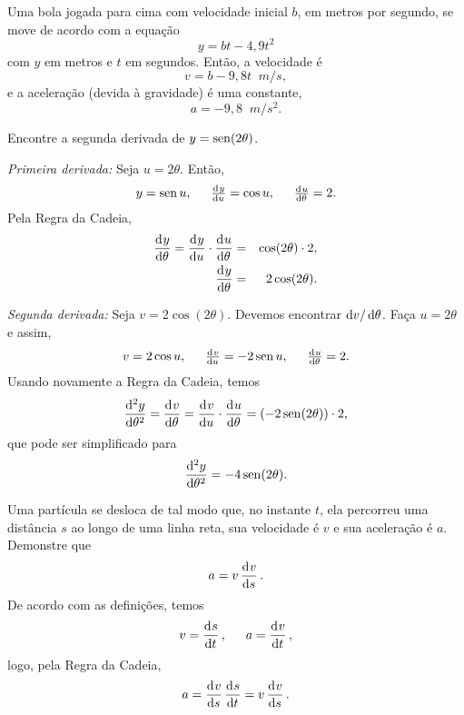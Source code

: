 \begin{example}
Uma bola jogada para cima com velocidade inicial $b$, em metros por segundo,
se move de acordo com a equação
$$
  y = bt - 4,9 t^2
$$
com $y$ em metros e $t$ em segundos. Então, a velocidade é
$$
  v = b - 9,8t \;\; \si{m/s},
$$
e a aceleração (devida à gravidade) é uma constante,
$$
  a = -9,8 \;\; \si{m/s^2}.
$$
\end{example}

\begin{example}
Encontre a segunda derivada de $y = \operatorname{sen}(2\theta)$.

\emph{Primeira derivada:} Seja $u = 2\theta$. Então,
$$
  y = \sen u, \hspace{1.5em} \od y u = \cos u, \hspace{1.5em}
  \od u \theta = 2.
$$
Pela Regra da Cadeia,
\begin{eqnarray*}
  \dod y \theta = \dod y u \cdot \dod u \theta
    & = & \cos(2\theta) \cdot 2, \\
  \dod y \theta & = & 2 \cos(2\theta).
\end{eqnarray*}

\emph{Segunda derivada:} Seja $v = 2 \cos(2\theta)$. Devemos encontrar
$\dv/\dif\theta$. Faça $u = 2\theta$ e assim,
$$
  v = 2 \cos u, \hspace{1.5em} \od v u = -2 \sen u, \hspace{1.5em}
  \od u \theta = 2.
$$
Usando novamente a Regra da Cadeia, temos
$$
  \dod[2] y \theta = \dod v \theta =
  \dod v u \cdot \dod u \theta =
  (-2 \sen(2\theta)) \cdot 2,
$$
que pode ser simplificado para
$$
  \dod[2] y \theta = -4 \sen(2\theta).
$$
\end{example}

\begin{example}\label{ex:chp2p7ex3}
Uma partícula se desloca de tal modo que, no instante $t$, ela percorreu uma
distância $s$ ao longo de uma linha reta, sua velocidade é $v$ e sua
aceleração é $a$. Demonstre que
$$
  a = v \dod v s.
$$
De acordo com as definições, temos
$$
  v = \dod s t, \hspace{1.5em} a = \dod v t,
$$
logo, pela Regra da Cadeia,
$$
  a = \dod v s \dod s t = v \dod v s.
$$
\end{example}

